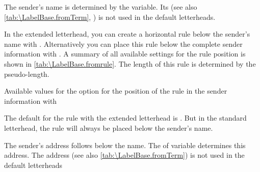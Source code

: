 \begin{Declaration}
\end{Declaration}
%
%
The sender's name is determined by the
 variable. Its  (see also
\autoref{tab:\LabelBase.fromTerm}, ) is
not used in the default letterheads.

In the extended letterhead, you
can create a horizontal rule below the sender's name with
.
Alternatively you can place
this rule below the complete sender information with
. A summary of all available settings for
the rule position is shown in \autoref{tab:\LabelBase.fromrule}. The length of
this rule is determined by the
 pseudo-length.

\begin{table}
  \caption[{Available values for the  option with
    }]{Available values for the  option for the
    position of the rule in the sender information with
    }
  \label{tab:\LabelBase.fromrule}
  \begin{desctabular}
  \end{desctabular}
\end{table}

The default for the rule with the extended letterhead is
. But in the standard letterhead, the rule will always be placed
below the sender's name.

The sender's address follows below the name.
The  of variable  determines this
address. The address  (see also
\autoref{tab:\LabelBase.fromTerm}) is not used in the default letterheads

